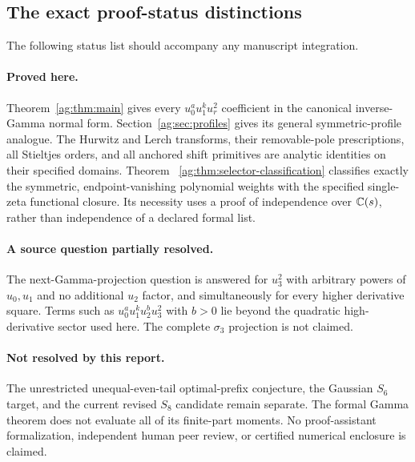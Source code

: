 \documentclass[11pt,letterpaper]{article}
\numberwithin{equation}{section}
\theoremstyle{definition}\newtheorem{definition}[theorem]{Definition}
\theoremstyle{remark}\newtheorem{remark}[theorem]{Remark}
\begin{document}
\subsection{The exact proof-status distinctions}
The following status list should accompany any manuscript integration.

\paragraph{Proved here.}
Theorem~\ref{ag:thm:main} gives every
$u_0^a u_1^k u_r^2$ coefficient in the canonical inverse-Gamma normal
form. Section~\ref{ag:sec:profiles} gives its general symmetric-profile
analogue. The Hurwitz and Lerch transforms, their removable-pole
prescriptions, all Stieltjes orders, and all anchored shift primitives
are analytic identities on their specified domains. Theorem~
\ref{ag:thm:selector-classification} classifies exactly the symmetric,
endpoint-vanishing polynomial weights with the specified single-zeta
functional closure. Its necessity uses a proof of independence over
$\mathbb C(s)$, rather than independence of a declared formal list.

\paragraph{A source question partially resolved.}
The next-Gamma-projection question is answered for $u_3^2$ with arbitrary
powers of $u_0,u_1$ and no additional $u_2$ factor, and simultaneously
for every higher derivative square. Terms such as
$u_0^a u_1^k u_2^b u_3^2$ with $b>0$ lie beyond the quadratic
high-derivative sector used here. The complete $\sigma_3$ projection is
not claimed.

\paragraph{Not resolved by this report.}
The unrestricted unequal-even-tail optimal-prefix conjecture, the
Gaussian $S_6$ target, and the current revised $S_8$ candidate remain
separate. The formal Gamma theorem does not evaluate all of its
finite-part moments. No proof-assistant formalization, independent
human peer review, or certified numerical enclosure is claimed.
\end{document}
